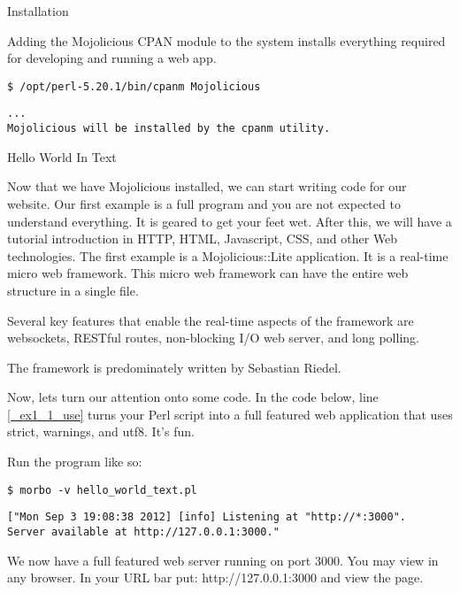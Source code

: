\documentclass[14pt]{extreport}
\begin{document}
{\Large Installation}

Adding the Mojolicious CPAN module to the system installs everything required
for developing and running a web app.

\begin{lstlisting}[style=BashInputStyle]
$ /opt/perl-5.20.1/bin/cpanm Mojolicious
\end{lstlisting}

\begin{lstlisting}[style=BashOutputStyle]
...
Mojolicious will be installed by the cpanm utility.
\end{lstlisting}

{\Large Hello World In Text}

Now that we have Mojolicious installed, we can start writing code for our
website. Our first example is a full program and you are not expected to
understand everything. It is geared to get your feet wet. After this, we will
have a tutorial introduction in HTTP, HTML, Javascript, CSS, and other Web
technologies.  The first example is a Mojolicious::Lite application. It is a
real-time micro web framework. This micro web framework can have the entire web
structure in a single file.

Several key features that enable the real-time aspects of the framework are
websockets, RESTful routes, non-blocking I/O web server, and long polling.

The framework is predominately written by Sebastian Riedel.

Now, lets turn our attention onto some code. In the code below, line
\ref{_ex1_1_use} turns your Perl script into a full featured web application
that uses strict, warnings, and utf8. It's fun.



Run the program like so:

\begin{lstlisting}[style=BashInputStyle]
$ morbo -v hello_world_text.pl
\end{lstlisting}

\begin{lstlisting}[style=BashOutputStyle]
["Mon Sep 3 19:08:38 2012] [info] Listening at "http://*:3000".
Server available at http://127.0.0.1:3000."
\end{lstlisting}

We now have a full featured web server running on port 3000. You may view in
any browser. In your URL bar put: http://127.0.0.1:3000 and view the page.
\end{document}
